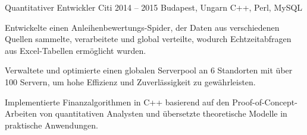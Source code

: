 \cvexperience
  {Quantitativer Entwickler}
  {Citi}
  {2014 -- 2015}
  {Budapest, Ungarn}
  {C++, Perl, MySQL}
  {%
    \item Entwickelte einen Anleihenbewertungs-Spider, der Daten aus verschiedenen Quellen sammelte, verarbeitete und global verteilte, wodurch Echtzeitabfragen aus Excel-Tabellen ermöglicht wurden.
    \item Verwaltete und optimierte einen globalen Serverpool an 6 Standorten mit über 100 Servern, um hohe Effizienz und Zuverlässigkeit zu gewährleisten.
    \item Implementierte Finanzalgorithmen in C++ basierend auf den Proof-of-Concept-Arbeiten von quantitativen Analysten und übersetzte theoretische Modelle in praktische Anwendungen.
  }
